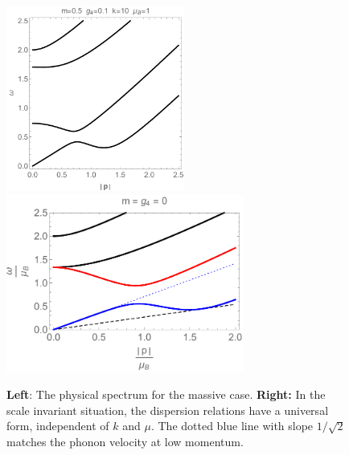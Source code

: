 \begin{figure}[h]
\begin{center}
\includegraphics[width=2.3in]{Chapter_3_Folder_1806.06976/figures/spectrummassive.pdf}\hspace{0.3in}\includegraphics[height=2.3in]{Chapter_3_Folder_1806.06976/figures/spectrumcrit.pdf}
\end{center}
    \caption[This figure shows two plots. One depicts the spectrum in the massive case, whereas the other shows the free scalar theory coupled to Chern-Simons.]{ \small{{\bf Left}: The physical spectrum for the massive case. {\bf Right:} In the scale invariant situation, the dispersion relations have a universal form, independent of $k$ and $\mu$. The dotted blue line with slope $1/\sqrt 2$ matches the phonon velocity at low momentum.
}}
\label{spectmassive}
\end{figure}
